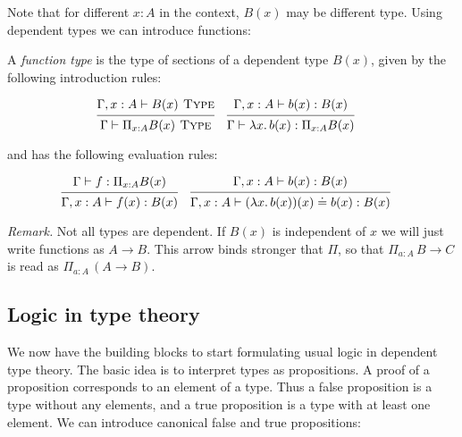\documentclass[a4paper, 12pt]{article}
\newcommand{\type}{\textsc{ Type}}
\newcommand{\la}[1]{\lambda{#1}.\,}
\theoremstyle{changedot}
\theoremstyle{changedotbreak}
\theoremstyle{nonumberplain}
\begin{document}
Note that for different $x : A$ in the context, $B(x)$ may be different type. Using dependent types we can introduce functions:

\begin{definition}
  A \textit{function type} is the type of sections of a dependent type $B(x)$, given by the following introduction rules:

  \begin{align*}
    &\begin{prooftree}
      \hypo{\Gamma, x : A \vdash B(x) \type}
      \infer1{\Gamma \vdash \Pi_{x:A} B(x) \type}
    \end{prooftree}
      &
    &\begin{prooftree}
      \hypo{\Gamma, x : A \vdash b(x) : B(x)}
      \infer1{\Gamma \vdash \la x b(x) : \Pi_{x:A} B(x)}
    \end{prooftree}
  \end{align*}

  and has the following evaluation rules:

  \begin{align*}
    &\begin{prooftree}
      \hypo{\Gamma \vdash f : \Pi_{x:A} B(x)}
      \infer1{\Gamma, x : A \vdash f(x) : B(x)}
    \end{prooftree}
    &
    &\begin{prooftree}
      \hypo{\Gamma, x : A \vdash b(x) : B(x)}
      \infer1{\Gamma, x : A \vdash (\la x b(x))(x) \doteq b(x) : B(x)}
    \end{prooftree}
  \end{align*}

\end{definition}

\textit{Remark.} Not all types are dependent. If $B(x)$ is independent of $x$ we will just write functions as $A \to B$. This arrow binds stronger that $\Pi$, so that $\Pi_{a:A}\, B \to C$ is read as $\Pi_{a:A}\, (A \to B)$.

\subsection{Logic in type theory}
We now have the building blocks to start formulating usual logic in dependent type theory. The basic idea is to interpret types as propositions. A proof of a proposition corresponds to an element of a type. Thus a false proposition is a type without any elements, and a true proposition is a type with at least one element. We can introduce canonical false and true propositions:
\end{document}
